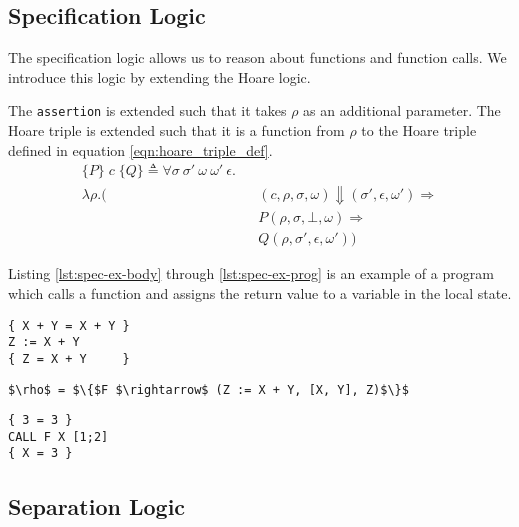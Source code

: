 \subsection{Specification Logic}
The specification logic allows us to reason about functions and function calls. We introduce this logic by extending the Hoare logic.

The \verb|assertion| is extended such that it takes $\rho$ as an additional parameter. The Hoare triple is extended such that it is a function from $\rho$ to the Hoare triple defined in equation \ref{eqn:hoare_triple_def}.
\begin{equation}
\begin{alignedat}{2}
\{P\}\;c\;\{Q\} \triangleq \forall \sigma \: \sigma' \: \omega \: \omega' \: \epsilon .\\
 \lambda\rho.(
  && (c,\rho,\sigma,\omega) \Downarrow (\sigma', \epsilon, \omega') \Rightarrow\\
&& P(\rho,\sigma,\bot,\omega) \Rightarrow\\
&& Q(\rho,\sigma',\epsilon,\omega'))
\end{alignedat}
\end{equation}

Listing \ref{lst:spec-ex-body} through \ref{lst:spec-ex-prog} is an example of a program which calls a function and assigns the return value to a variable in the local state.

\begin{lstlisting}[mathescape=true,keepspaces=true,label=lst:spec-ex-body,caption=The body of the function F]
{ X + Y = X + Y }
Z := X + Y
{ Z = X + Y     }
\end{lstlisting}

\begin{lstlisting}[mathescape=true,keepspaces=true,label=lst:spec-ex-env,caption=A partial function space containing the function F.]
$\rho$ = $\{$F $\rightarrow$ (Z := X + Y, [X, Y], Z)$\}$
\end{lstlisting}

\begin{lstlisting}[mathescape=true,keepspaces=true,label=lst:spec-ex-prog,caption=A program which calls the function F and stores the result in X]
{ 3 = 3 }
CALL F X [1;2]
{ X = 3 }
\end{lstlisting}

\subsection{Separation Logic}


